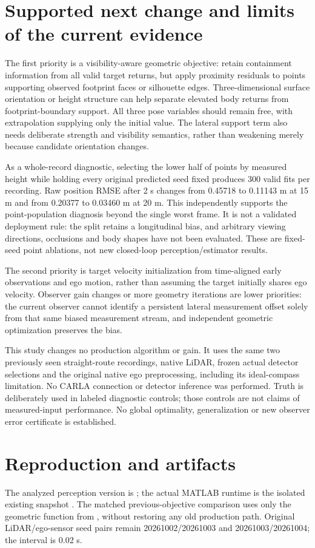 \documentclass[11pt]{article}
\begin{document}
\section{Supported next change and limits of the current evidence}
The first priority is a visibility-aware geometric objective: retain
containment information from all valid target returns, but apply proximity
residuals to points supporting observed footprint faces or silhouette edges.
Three-dimensional surface orientation or height structure can help separate
elevated body returns from footprint-boundary support. All three pose
variables should remain free, with extrapolation supplying only the initial
value. The lateral support term also needs deliberate strength and visibility
semantics, rather than weakening merely because candidate orientation changes.

As a whole-record diagnostic, selecting the lower half of points by measured
height while holding every original predicted seed fixed produces 300 valid
fits per recording. Raw position RMSE after 2 s changes from 0.45718 to
0.11143 m at 15 m and from 0.20377 to 0.03460 m at 20 m. This independently
supports the point-population diagnosis beyond the single worst frame.
It is not a validated deployment rule: the split retains a longitudinal
bias, and arbitrary viewing directions, occlusions and body shapes have not
been evaluated. These are fixed-seed point ablations, not new closed-loop
perception/estimator results.

The second priority is target velocity initialization from time-aligned
early observations and ego motion, rather than assuming the target initially
shares ego velocity. Observer gain changes or more geometry iterations are
lower priorities: the current observer cannot identify a persistent lateral
measurement offset solely from that same biased measurement stream, and
independent geometric optimization preserves the bias.

This study changes no production algorithm or gain. It uses the same two
previously seen straight-route recordings, native LiDAR, frozen actual
detector selections and the original native ego preprocessing, including
its ideal-compass limitation. No CARLA connection or detector inference
was performed. Truth is deliberately used in labeled diagnostic controls;
those controls are not claims of measured-input performance. No global
optimality, generalization or new observer error certificate is established.

\section{Reproduction and artifacts}
The analyzed perception version is
; the actual MATLAB runtime is
the isolated existing snapshot
. The matched previous-objective
comparison uses only the geometric function from
, without restoring any old
production path. Original LiDAR/ego-sensor seed pairs remain
20261002/20261003 and 20261003/20261004; the interval is 0.02 s.
\end{document}
